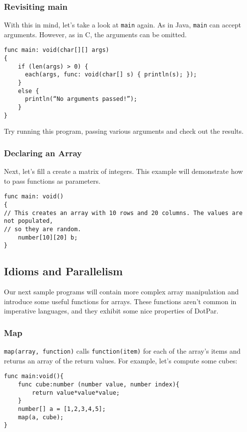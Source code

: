 \documentclass{article}
\begin{document}
\subsubsection{Revisiting main}
With this in mind, let's take a look at \verb=main= again. As in Java, \verb=main= can accept arguments. However, as in C, the arguments can be omitted.

\begin{verbatim}
func main: void(char[][] args)
{
    if (len(args) > 0) {
      each(args, func: void(char[] s) { println(s); });
    }   
    else {
      println(“No arguments passed!”);
    }
}
\end{verbatim}

Try running this program, passing various arguments and check out the results.

\subsubsection{Declaring an Array}
Next, let's fill a create a matrix of integers. This example will demonstrate how to pass functions as parameters.

\begin{verbatim}
func main: void()
{
// This creates an array with 10 rows and 20 columns. The values are not populated,
// so they are random.
    number[10][20] b;
}
\end{verbatim}

\subsection{Idioms and Parallelism}
Our next sample programs will contain more complex array manipulation and introduce some useful functions for arrays. These functions aren't common in imperative languages, and they exhibit some nice properties of DotPar.

\subsubsection{Map}
\verb=map(array, function)= calls \verb=function(item)= for each of the array's items and returns an array of the return values.  For example, let's compute some cubes:

\begin{verbatim}
func main:void(){
    func cube:number (number value, number index){
        return value*value*value;
    }
    number[] a = [1,2,3,4,5];
    map(a, cube);
}
\end{verbatim}
\end{document}
